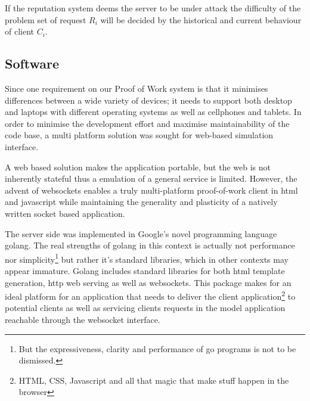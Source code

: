 If the reputation system deems the server to be under attack the difficulty of the problem set of request $R_i$ will be decided by the historical and current behaviour of client $C_i$. 



\subsection{Software}
Since one requirement on our Proof of Work system is that it minimises differences between a wide variety of devices; it needs to support both desktop and laptops with different operating systems as well as cellphones and tablets.
In order to minimise the development effort and maximise maintainability of the code base, a multi platform solution was sought for web-based simulation interface. 

A web based solution makes the application portable, but the web is not inherently stateful thus a emulation of a general service is limited. However, the advent of websockets enables a truly multi-platform proof-of-work client in html and javascript while maintaining the generality and plasticity of a natively written socket based application. 
\begin{comment}
The javascript implementation for handling the protocol is quite simple:
\jscode[firstline=57, firstnumber=57, lastline=84]{../pow.js}
The solution finding part also need to be presented:
\jscode[firstline=26, firstnumber=26, lastline=49]{../pow.js}
To trigger a request to be sent to the server we build the following function which is then registered to the onclick event of a button in the web gui:
\jscode[firstline=100, firstnumber=100, lastline=105]{../pow.js}
\end{comment}

The server side was implemented in Google's novel programming language golang\cite{golang}. The real strengths of golang in this context is actually not performance nor simplicity\footnote{But the expressiveness, clarity and performance of go programs is not to be dismissed.} but rather it's standard libraries, which in other contexts may appear immature. Golang includes standard libraries for both html template generation, http web serving as well as websockets. This package makes for an ideal platform for an application that needs to deliver the client application\footnote{HTML, CSS, Javascript and all that magic that make stuff happen in the browser} to potential clients as well as servicing clients requests in the model application reachable through the websocket interface. 

